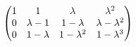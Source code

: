 \documentclass[preview]{standalone}
\begin{document}
\begin{align*}
\special{dvisvgm:raw <g id='unique000'>}\begin{pmatrix}1&1&\lambda&\lambda^2\\0&\lambda-1&1-\lambda&\lambda-\lambda^2\\0&1-\lambda&1-\lambda^2&1-\lambda^3\end{pmatrix}\special{dvisvgm:raw </g>}
\end{align*}
\end{document}
